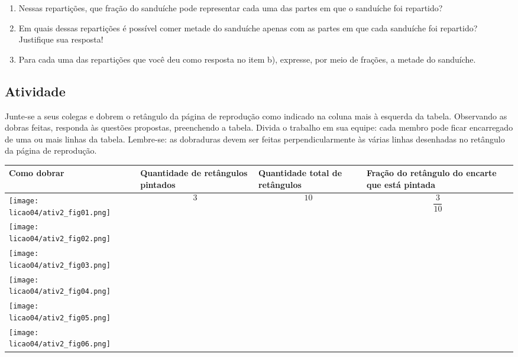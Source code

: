 \begin{enumerate} [\quad a)] %
  \item     Nessas repartições, que fração do sanduíche pode representar cada uma das partes em que o sanduíche foi repartido?
  \item     Em quais dessas repartições é possível comer metade do sanduíche apenas com as partes em que cada sanduíche foi repartido? Justifique sua resposta!
  \item     Para cada uma das repartições que você deu como resposta no item b), expresse, por meio de frações, a metade do sanduíche.
\end{enumerate} %

\subsection{Atividade}

Junte-se a seus colegas e dobrem o retângulo da página de reprodução como indicado na coluna mais à esquerda da tabela. Observando as dobras feitas, responda às questões propostas, preenchendo a tabela. Divida o trabalho em sua equipe: cada membro pode ficar encarregado de uma ou mais linhas da tabela. Lembre-se: as dobraduras devem ser feitas perpendicularmente às várias linhas desenhadas no retângulo da página de reprodução.


  \begin{longtable}{|m{}|m{}|m{}|m{}|}
    \hline
      Como dobrar  &  Quantidade de retângulos pintados  & Quantidade total de retângulos  &  Fração do retângulo do encarte que está pintada  \\
    \hline \hline
    \endhead
    \texttt{[image: licao04/ativ2\_fig01.png]}      & $$3$$& $$10$$ & $$\dfrac{3}{10}$$   \\
    \hline
     \texttt{[image: licao04/ativ2\_fig02.png]}                                                                              & &  &  \\
    \hline
     \texttt{[image: licao04/ativ2\_fig03.png]}     &  &   &  \\
    \hline
     \texttt{[image: licao04/ativ2\_fig04.png]} & &&\\
    \hline
     \texttt{[image: licao04/ativ2\_fig05.png]}  &                                     &                                  &                                                   \\
    \hline
     \texttt{[image: licao04/ativ2\_fig06.png]} &                                     &                                  &                                                   \\
    \hline
  \end{longtable}


